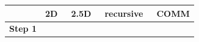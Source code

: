 \documentclass[sigplan,review,anonymous,10pt]{acmart}\settopmatter{printfolios=true,printccs=false,printacmref=false}
\begin{document}
\begin{table}
	\setlength{\tabcolsep}{4pt}
	\renewcommand{\arraystretch}{1}
	\centering
	\scriptsize
	\sf
	\begin{tabular}{lllll}
		\toprule
		& \textbf{2D~\cite{summa}} & \textbf{2.5D~\cite{25d}} & 
		\textbf{recursive~\cite{CARMA}} & \textbf{COMM} \\
		\midrule
		\textbf{Step 1}

\end{tabular}
\end{table}
\end{document}
